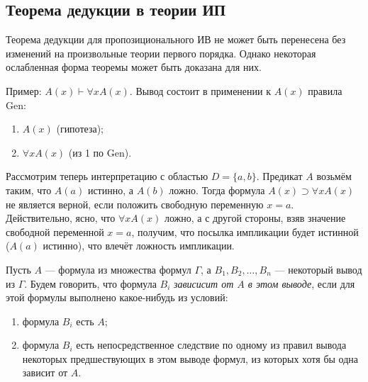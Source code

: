\subsection{Теорема дедукции в теории ИП}
Теорема дедукции для пропозиционального ИВ не может быть перенесена без изменений на произвольные теории первого порядка. Однако некоторая ослабленная форма теоремы может быть доказана для них.

Пример: $A(x) \vdash \forall xA(x)$. Вывод состоит в применении к $A(x)$ правила Gen:
\begin{enumerate}
    \item $A(x)$ (гипотеза);
    \item $\forall xA(x)$ (из 1 по Gen).
\end{enumerate}
Рассмотрим теперь интерпретацию с областью $D = \{a, b\}$. Предикат $A$ возьмём таким, что $A(a)$ истинно, а $A(b)$ ложно. Тогда формула $A(x) \supset \forall xA(x)$ не является верной, если положить свободную переменную $x = a$. Действительно, ясно, что $\forall xA(x)$ ложно, а с другой стороны, взяв значение свободной переменной $x = a$, получим, что посылка импликации будет истинной ($A(a)$ истинно), что влечёт ложность импликации.

Пусть $A$ --- формула из множества формул $\Gamma$, а $B_1, B_2, \dots, B_n$ --- некоторый вывод из $\Gamma$. Будем говорить, что формула $B_i$ \textit{зависисит от $A$ в этом выводе}, если для этой формулы выполнено какое-нибудь из условий:
\begin{enumerate}
    \item формула $B_i$ есть $A$;
    \item формула $B_i$ есть непосредственное следствие по одному из правил вывода некоторых предшествующих в этом выводе формул, из которых хотя бы одна зависит от $A$.
\end{enumerate}

